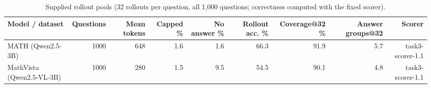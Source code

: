 \begin{table}[t]
\centering
\small
\caption{Supplied rollout pools (32 rollouts per question, all 1,000 questions; correctness computed with the fixed scorer).}
\label{tab:T1_data}
\begin{tabular}{lrrrrrrrr}
\toprule
Model / dataset & Questions & Mean tokens & Capped \% & No answer \% & Rollout acc. \% & Coverage@32 \% & Answer groups@32 & Scorer \\
\midrule
MATH (Qwen2.5-3B) & 1000 & 648 & 1.6 & 1.6 & 66.3 & 91.9 & 5.7 & task3-scorer-1.1 \\
MathVista (Qwen2.5-VL-3B) & 1000 & 280 & 1.5 & 9.5 & 54.5 & 90.1 & 4.8 & task3-scorer-1.1 \\
\bottomrule
\end{tabular}
\end{table}
